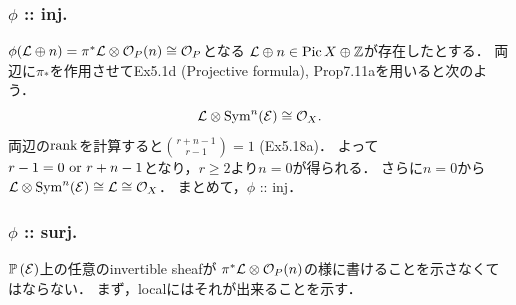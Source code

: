\documentclass[a4paper]{jsarticle}
\newcommand{\Pic}{\operatorname{Pic}}
\newcommand{\Sym}{\operatorname{Sym}}
\newcommand{\pbundle}{\mathbb{P}\,}
\begin{document}
    \subsubsection{$\phi$ :: inj.}
    $\phi(\mathcal{L} \oplus n)=\pi^* \mathcal{L} \otimes \mathcal{O}_P(n) \cong \mathcal{O}_P$となる
    $\shL \oplus n \in \Pic X \oplus \Z$が存在したとする．
    両辺に$\pi_*$を作用させてEx5.1d (Projective formula), Prop7.11aを用いると次のよう．
    \[ \shL \otimes \Sym^n(\shE) \iso \shO_X. \]
    両辺の$\operatorname{rank}$を計算すると$\binom{r+n-1}{r-1}=1$ (Ex5.18a)．
    よって$r-1=0 \text{ or } r+n-1$となり，$r \geq 2$より$n=0$が得られる．
    さらに$n=0$から$\shL \otimes \Sym^n(\shE) \iso \shL\iso \shO_X$．
    まとめて，$\phi$ :: inj．

    \subsubsection{$\phi$ :: surj.}
    $\pbundle(\shE)$上の任意のinvertible sheafが
    $\pi^* \mathcal{L} \otimes \mathcal{O}_P(n)$の様に書けることを示さなくてはならない．
    まず，localにはそれが出来ることを示す．
\end{document}
